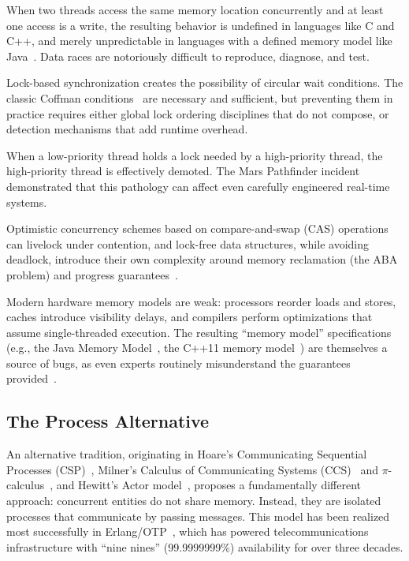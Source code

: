 \documentclass[11pt,a4paper]{article}
\begin{document}
\begin{description}[leftmargin=2em]
\item[Data races.] When two threads access the same memory location concurrently and at least one access is a write, the resulting behavior is undefined in languages like C and C++, and merely unpredictable in languages with a defined memory model like Java~\citep{manson2005java}. Data races are notoriously difficult to reproduce, diagnose, and test.

\item[Deadlocks.] Lock-based synchronization creates the possibility of circular wait conditions. The classic Coffman conditions~\citep{coffman1971system} are necessary and sufficient, but preventing them in practice requires either global lock ordering disciplines that do not compose, or detection mechanisms that add runtime overhead.

\item[Priority inversion.] When a low-priority thread holds a lock needed by a high-priority thread, the high-priority thread is effectively demoted. The Mars Pathfinder incident~\citep{reeves1997mars} demonstrated that this pathology can affect even carefully engineered real-time systems.

\item[Livelock and starvation.] Optimistic concurrency schemes based on compare-and-swap (CAS) operations can livelock under contention, and lock-free data structures, while avoiding deadlock, introduce their own complexity around memory reclamation (the ABA problem) and progress guarantees~\citep{michael2004hazard}.

\item[Memory model subtleties.] Modern hardware memory models are weak: processors reorder loads and stores, caches introduce visibility delays, and compilers perform optimizations that assume single-threaded execution. The resulting ``memory model'' specifications (e.g., the Java Memory Model~\citep{manson2005java}, the C++11 memory model~\citep{boehm2008foundations}) are themselves a source of bugs, as even experts routinely misunderstand the guarantees provided~\citep{sewell2010x86}.
\end{description}

\subsection{The Process Alternative}

An alternative tradition, originating in Hoare's Communicating Sequential Processes (CSP)~\citep{hoare1978communicating}, Milner's Calculus of Communicating Systems (CCS)~\citep{milner1980calculus} and $\pi$-calculus~\citep{milner1992calculus}, and Hewitt's Actor model~\citep{hewitt1973universal}, proposes a fundamentally different approach: concurrent entities do not share memory. Instead, they are isolated processes that communicate by passing messages. This model has been realized most successfully in Erlang/OTP~\citep{armstrong2003making}, which has powered telecommunications infrastructure with ``nine nines'' (99.9999999\%) availability for over three decades.
\end{document}
